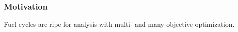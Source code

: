 \begin{frame}
    \frametitle{Motivation}
    Fuel cycles are ripe for analysis with multi- and many-objective optimization.
\end{frame}
